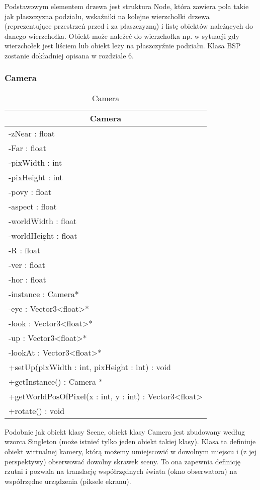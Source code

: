 Podstawowym elementem drzewa jest struktura Node, która zawiera pola takie jak płaszczyzna podziału, wskaźniki na kolejne wierzchołki drzewa (reprezentujące przestrzeń przed i za płaszczyzną) i listę obiektów należących do danego wierzchołka. Obiekt może należeć do wierzchołka np. w sytuacji gdy wierzchołek jest liściem lub obiekt leży na płaszczyźnie podziału. Klasa BSP zostanie dokładniej opisana w rozdziale 6.

\subsubsection{Camera}

\footnotesize
\begin{longtable}{|p{14cm}|}
    \caption{Camera} \label{tab:Camera} \\ \hline
    \multicolumn{1}{|c|}{Camera} \\ \hline
    -zNear : float \\
    -Far : float \\
    -pixWidth : int \\
    -pixHeight : int \\
    -povy : float \\
    -aspect : float \\
    -worldWidth : float \\
    -worldHeight : float \\
    -R : float \\
    -ver : float \\
    -hor : float \\
    -instance : Camera* \\ 
    -eye : Vector3<float>* \\
    -look : Vector3<float>* \\
    -up : Vector3<float>* \\
    -lookAt : Vector3<float>* \\
    \hline
    +setUp(pixWidth : int, pixHeight : int) : void \\
    +getInstance() : Camera * \\
    +getWorldPosOfPixel(x : int, y : int) : Vector3<float> \\
    +rotate() : void \\
    \hline
\end{longtable}
\normalsize

Podobnie jak obiekt klasy Scene, obiekt klasy Camera jest zbudowany według wzorca Singleton (może istnieć tylko jeden obiekt takiej klasy). Klasa ta definiuje obiekt wirtualnej kamery, którą możemy umiejscowić w dowolnym miejscu i (z jej perspektywy) obserwować dowolny skrawek sceny. To ona zapewnia definicję rzutni i pozwala na translację współrzędnych świata (okno obserwatora) na współrzędne urządzenia (piksele ekranu).


